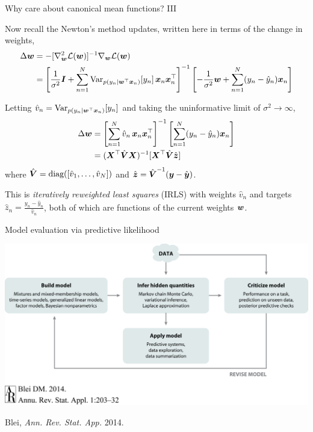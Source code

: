 \documentclass[aspectratio=169]{beamer}
\begin{document}
\begin{frame}{Why care about canonical mean functions? III}

Now recall the Newton's method updates, written here in terms of the change in weights,
\begin{align}
    \Delta \boldsymbol{w} &= - [\nabla_{\boldsymbol{w}}^2 \mathcal{L}(\boldsymbol{w})]^{-1} \nabla_{\boldsymbol{w}} \mathcal{L}(\boldsymbol{w}) \\
    &= \left[\frac{1}{\sigma^2}\boldsymbol{I} + \sum_{n=1}^N \mathrm{Var}_{p(y_n | \boldsymbol{w}^\top \boldsymbol{x}_n)}[y_n] \, \boldsymbol{x}_n \boldsymbol{x}_n^\top \right]^{-1} \left[ -\frac{1}{\sigma^2}\boldsymbol{w} + \sum_{n=1}^N (y_n - \hat{y}_n) \boldsymbol{x}_n \right]
\end{align}

Letting $\hat{v}_n = \mathrm{Var}_{p(y_n | \boldsymbol{w}^\top \boldsymbol{x}_n)}[y_n]$ and taking the uninformative limit of $\sigma^2 \to \infty$, 
\begin{align}
    \Delta \boldsymbol{w} &=
    \left[\sum_{n=1}^N \hat{v}_n \, \boldsymbol{x}_n \boldsymbol{x}_n^\top \right]^{-1} \left[ \sum_{n=1}^N (y_n - \hat{y}_n) \boldsymbol{x}_n \right] \\
    &= (\boldsymbol{X}^\top \hat{\boldsymbol{V}} \boldsymbol{X})^{-1} [\boldsymbol{X}^\top \hat{\boldsymbol{V}} \hat{\boldsymbol{z}}]
\end{align}
where $\hat{\boldsymbol{V}} = \textrm{diag}([\hat{v}_1, \ldots, \hat{v}_N])$ and $\hat{\boldsymbol{z}} = \hat{\boldsymbol{V}}^{-1} (\boldsymbol{y} - \hat{\boldsymbol{y}})$. 

This is \emph{iteratively reweighted least squares} (IRLS) with weights $\hat{v}_n$ and targets $\hat{z}_n = \frac{y_n - \hat{y}_n}{\hat{v}_n}$, both of which are functions of the current weights $\boldsymbol{w}$.
\end{frame}

\begin{frame}{Model evaluation via predictive likelihood}
\begin{center}
\includegraphics[width=.85\linewidth]{figures/lap1/boxsloop.jpeg}\\
\end{center} 
\begin{flushright}
{\footnotesize Blei, \textit{Ann. Rev. Stat. App.} 2014.}
\end{flushright}
\end{frame}
\end{document}
